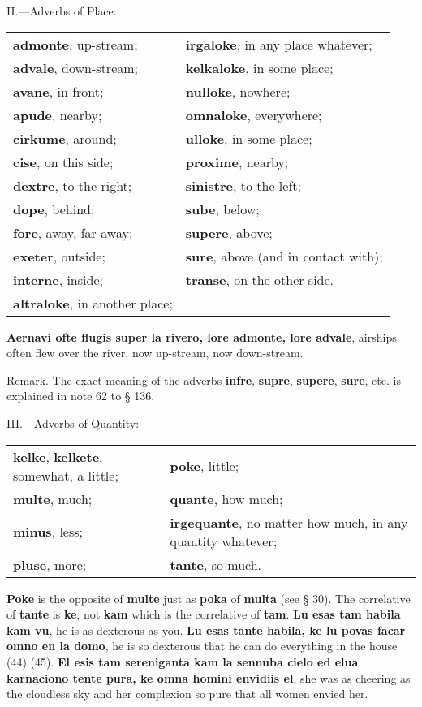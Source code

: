 \begin{center}II.—Adverbs of Place:\end{center}
\begin{tabular}{l l}
\textbf{admonte}, up-stream; & \textbf{irgaloke}, in any place whatever; \\
\textbf{advale}, down-stream; & \textbf{kelkaloke}, in some place; \\
\textbf{avane}, in front; & \textbf{nulloke}, nowhere; \\
\textbf{apude}, nearby; & \textbf{omnaloke}, everywhere; \\
\textbf{cirkume}, around; & \textbf{ulloke}, in some place; \\
\textbf{cise}, on this side; & \textbf{proxime}, nearby; \\
\textbf{dextre}, to the right; & \textbf{sinistre}, to the left; \\
\textbf{dope}, behind; & \textbf{sube}, below; \\
\textbf{fore}, away, far away; & \textbf{supere}, above; \\
\textbf{exeter}, outside; & \textbf{sure}, above (and in contact with); \\
\textbf{interne}, inside; & \textbf{transe}, on the other side. \\
\textbf{altraloke}, in another place; & 
\end{tabular}

\textbf{Aernavi ofte flugis super la rivero, lore admonte, lore advale}, airships often flew over the river, now up-stream, now down-stream.

\small Remark. The exact meaning of the adverbs \textbf{infre}, \textbf{supre}, \textbf{supere}, \textbf{sure}, etc. is explained in note 62  to § 136. \normalsize

\begin{center}III.—Adverbs of Quantity:\end{center}
\begin{tabular}{l l}
\textbf{kelke}, \textbf{kelkete}, somewhat, a little; & \textbf{poke}, little; \\
\textbf{multe}, much; & \textbf{quante}, how much; \\
\textbf{minus}, less; & \textbf{irgequante}, no matter how much, in any quantity whatever; \\
\textbf{pluse}, more; & \textbf{tante}, so much.
\end{tabular}

\textbf{Poke} is the opposite of \textbf{multe} just as \textbf{poka} of \textbf{multa} (see § 30).
The correlative of \textbf{tante} is \textbf{ke}, not \textbf{kam} which is the correlative of \textbf{tam}. \textbf{Lu esas tam habila kam vu}, he is as dexterous as you. \textbf{Lu esas tante habila, ke lu povas facar omno en la domo}, he is so dexterous that he can do everything in the house (44) (45). \textbf{El esis tam sereniganta kam la sennuba cielo ed elua karnaciono tente pura, ke omna homini envidiis el}, she was as cheering as the cloudless sky and her complexion so pure that all women envied her.

